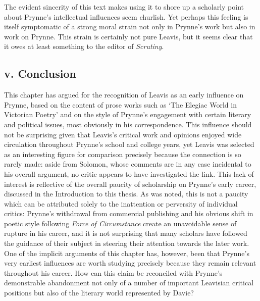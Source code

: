 \documentclass[]{article}
\begin{document}
\noindent The evident sincerity of this text makes using it to shore up
a scholarly point about Prynne’s intellectual influences seem churlish.
Yet perhaps this feeling is itself symptomatic of a strong moral strain
not only in Prynne’s work but also in work on Prynne. This strain is
certainly not pure Leavis, but it seems clear that it owes at least
something to the editor of \emph{Scrutiny}.

\subsection{v. Conclusion}\label{v.-conclusion}

This chapter has argued for the recognition of Leavis as an early
influence on Prynne, based on the content of prose works such as ‘The
Elegiac World in Victorian Poetry’ and on the style of Prynne’s
engagement with certain literary and political issues, most obviously in
his correspondence. This influence should not be surprising given that
Leavis’s critical work and opinions enjoyed wide circulation throughout
Prynne’s school and college years, yet Leavis was selected as an
interesting figure for comparison precisely because the connection is so
rarely made: aside from Solomon, whose comments are in any case
incidental to his overall argument, no critic appears to have
investigated the link. This lack of interest is reflective of the
overall paucity of scholarship on Prynne’s early career, discussed in
the Introduction to this thesis. As was noted, this is not a paucity
which can be attributed solely to the inattention or perversity of
individual critics: Prynne’s withdrawal from commercial publishing and
his obvious shift in poetic style following \emph{Force of Circumstance}
create an unavoidable sense of rupture in his career, and it is not
surprising that many scholars have followed the guidance of their
subject in steering their attention towards the later work. One of the
implicit arguments of this chapter has, however, been that Prynne’s very
earliest influences are worth studying precisely because they remain
relevant throughout his career. How can this claim be reconciled with
Prynne’s demonstrable abandonment not only of a number of important
Leavisian critical positions but also of the literary world represented
by Davie?
\end{document}
